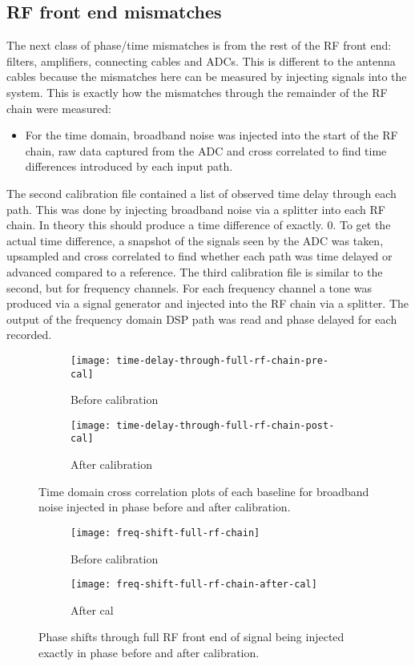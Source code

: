 \subsection{RF front end mismatches}
The next class of phase/time mismatches is from the rest of the RF front end: filters, amplifiers, connecting cables and ADCs. This is different to the antenna cables because the mismatches here can be measured by injecting signals into the system. This is exactly how the mismatches through the remainder of the RF chain were measured:
\begin{itemize}
  \item For the time domain, broadband noise was injected into the start of the RF chain, raw data captured from the ADC and cross correlated to find time differences introduced by each input path. 
\end{itemize}
The second calibration file contained a list of observed time delay through each path. This was done by injecting broadband noise via a splitter into each RF chain. In theory this should produce a time difference of exactly. 0. To get the actual time difference, a snapshot of the signals seen by the ADC was taken, upsampled and cross correlated to find whether each path was time delayed or advanced compared to a reference.
The third calibration file is similar to the second, but for frequency channels. For each frequency channel a tone was produced via a signal generator and injected into the RF chain via a splitter. The output of the frequency domain DSP path was read and phase delayed for each recorded.

\begin{figure}
  \centering
  \begin{subfigure}[b]{0.49\textwidth}
    \centering
    \texttt{[image: time-delay-through-full-rf-chain-pre-cal]}
    \caption{Before calibration}
  \end{subfigure}
  \begin{subfigure}[b]{0.49\textwidth}
    \centering
    \texttt{[image: time-delay-through-full-rf-chain-post-cal]}
    \caption{After calibration}
  \end{subfigure}
  \caption{Time domain cross correlation plots of each baseline for broadband noise injected in phase before and after calibration.}
\end{figure}

\begin{figure}
  \begin{subfigure}[b]{0.49\textwidth}
    \centering
    \texttt{[image: freq-shift-full-rf-chain]}
    \caption{Before calibration}
  \end{subfigure}
  \begin{subfigure}[b]{0.49\textwidth}
    \centering
    \texttt{[image: freq-shift-full-rf-chain-after-cal]}
    \caption{After cal}
  \end{subfigure}
  \caption{Phase shifts through full RF front end of signal being injected exactly in phase before and after calibration.}
\end{figure}


